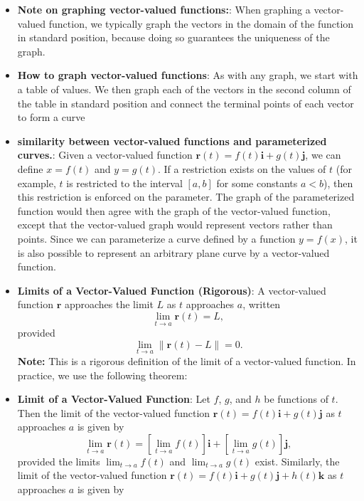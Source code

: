 \documentclass{report}
\begin{document}
\begin{itemize}
        \item \textbf{Note on graphing vector-valued functions:}: When graphing a vector-valued function, we typically graph the vectors in the domain of the function in standard position, because doing so guarantees the uniqueness of the graph.
        \item \textbf{How to graph vector-valued functions}: As with any graph, we start with a table of values. We then graph each of the vectors in the second column of the table in standard position and connect the terminal points of each vector to form a curve
            \bigbreak \noindent 
        \item \textbf{similarity between vector-valued functions and parameterized curves.}:
            Given a vector-valued function \( \mathbf{r}(t) = f(t)\mathbf{i} + g(t)\mathbf{j} \), we can define \( x = f(t) \) and \( y = g(t) \). If a restriction exists on the values of \( t \) (for example, \( t \) is restricted to the interval \([a, b]\) for some constants \( a < b \)), then this restriction is enforced on the parameter. The graph of the parameterized function would then agree with the graph of the vector-valued function, except that the vector-valued graph would represent vectors rather than points. Since we can parameterize a curve defined by a function \( y = f(x) \), it is also possible to represent an arbitrary plane curve by a vector-valued function.
        \item \textbf{Limits of a Vector-Valued Function (Rigorous)}:
            A vector-valued function \(\mathbf{r}\) approaches the limit \(L\) as \(t\) approaches \(a\), written
            \[
                \lim_{t \to a} \mathbf{r}(t) = L,
            \]
            provided
            \[
                \lim_{t \to a} \|\mathbf{r}(t) - L\| = 0.
            \]
            \textbf{Note:} This is a rigorous definition of the limit of a vector-valued function. In practice, we use the following theorem:
        \item \textbf{Limit of a Vector-Valued Function}:
            Let \(f\), \(g\), and \(h\) be functions of \(t\). Then the limit of the vector-valued function  \(\mathbf{r}(t) = f(t)\mathbf{i} + g(t)\mathbf{j}\) as \(t\) approaches \(a\) is given by
            \[
                \lim_{t \to a} \mathbf{r}(t) = \left[ \lim_{t \to a} f(t) \right]\mathbf{i} + \left[ \lim_{t \to a} g(t) \right]\mathbf{j},
            \]
            provided the limits  \(\lim_{t \to a} f(t)\) and \(\lim_{t \to a} g(t)\) exist. Similarly, the limit of the vector-valued function  \(\mathbf{r}(t) = f(t)\mathbf{i} + g(t)\mathbf{j} + h(t)\mathbf{k}\) as \(t\) approaches \(a\) is given by

\end{itemize}
\end{document}
